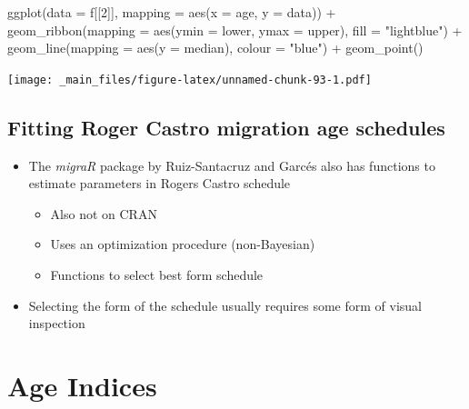 \documentclass[
]{book}
\newenvironment{Shaded}{\begin{snugshade}}{\end{snugshade}}
\newcommand{\AttributeTok}[1]{\textcolor[rgb]{0.77,0.63,0.00}{#1}}
\newcommand{\DecValTok}[1]{\textcolor[rgb]{0.00,0.00,0.81}{#1}}
\newcommand{\FunctionTok}[1]{\textcolor[rgb]{0.00,0.00,0.00}{#1}}
\newcommand{\NormalTok}[1]{#1}
\newcommand{\SpecialCharTok}[1]{\textcolor[rgb]{0.00,0.00,0.00}{#1}}
\newcommand{\StringTok}[1]{\textcolor[rgb]{0.31,0.60,0.02}{#1}}
\providecommand{\tightlist}{%
  \setlength{\itemsep}{0pt}\setlength{\parskip}{0pt}}
\begin{document}
\begin{Shaded}
\begin{Highlighting}[]
\FunctionTok{ggplot}\NormalTok{(}\AttributeTok{data =}\NormalTok{ f[[}\DecValTok{2}\NormalTok{]], }
       \AttributeTok{mapping =} \FunctionTok{aes}\NormalTok{(}\AttributeTok{x =}\NormalTok{ age, }\AttributeTok{y =}\NormalTok{ data)) }\SpecialCharTok{+}
  \FunctionTok{geom\_ribbon}\NormalTok{(}\AttributeTok{mapping =} \FunctionTok{aes}\NormalTok{(}\AttributeTok{ymin =}\NormalTok{ lower, }\AttributeTok{ymax =}\NormalTok{ upper), }\AttributeTok{fill =} \StringTok{"lightblue"}\NormalTok{) }\SpecialCharTok{+}
  \FunctionTok{geom\_line}\NormalTok{(}\AttributeTok{mapping =} \FunctionTok{aes}\NormalTok{(}\AttributeTok{y =}\NormalTok{ median), }\AttributeTok{colour =} \StringTok{"blue"}\NormalTok{) }\SpecialCharTok{+}
  \FunctionTok{geom\_point}\NormalTok{() }
\end{Highlighting}
\end{Shaded}

\texttt{[image: \_main\_files/figure-latex/unnamed-chunk-93-1.pdf]}

\hypertarget{fitting-roger-castro-migration-age-schedules-5}{%
\subsection{Fitting Roger Castro migration age schedules}\label{fitting-roger-castro-migration-age-schedules-5}}

\begin{itemize}
\tightlist
\item
  The \emph{migraR} package by Ruiz-Santacruz and Garcés also has functions to estimate parameters in Rogers Castro schedule

  \begin{itemize}
  \tightlist
  \item
    Also not on CRAN
  \item
    Uses an optimization procedure (non-Bayesian)
  \item
    Functions to select best form schedule
  \end{itemize}
\item
  Selecting the form of the schedule usually requires some form of visual inspection
\end{itemize}

\hypertarget{age-indices}{%
\section{Age Indices}\label{age-indices}}
\end{document}
